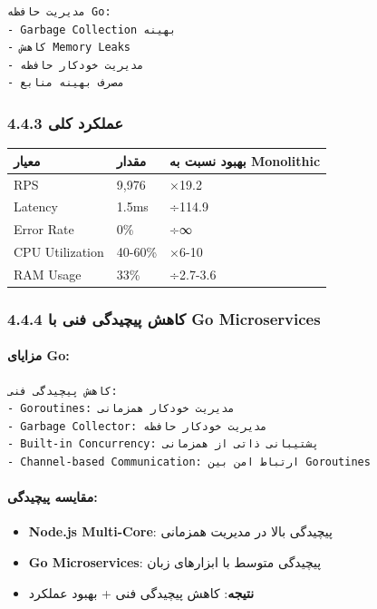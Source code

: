 \documentclass[
]{article}
\newcounter{none} %
\providecommand{\tightlist}{%
  \setlength{\itemsep}{0pt}\setlength{\parskip}{0pt}}
\begin{document}
\begin{verbatim}
مدیریت حافظه Go:
- Garbage Collection بهینه
- کاهش Memory Leaks
- مدیریت خودکار حافظه
- مصرف بهینه منابع
\end{verbatim}

\subsubsection{4.4.3 عملکرد
کلی}\label{ux639ux645ux644ux6a9ux631ux62f-ux6a9ux644ux6cc-2}

{\def\LTcaptype{none} %
\begin{longtable}[]{@{}lll@{}}
\toprule\noalign{}
معیار & مقدار & بهبود نسبت به Monolithic \\
\midrule\noalign{}
\endhead
\bottomrule\noalign{}
\endlastfoot
RPS & 9,976 & ×19.2 \\
Latency & 1.5ms & ÷114.9 \\
Error Rate & 0\% & ÷∞ \\
CPU Utilization & 40-60\% & ×6-10 \\
RAM Usage & 33\% & ÷2.7-3.6 \\
\end{longtable}
}

\subsubsection{4.4.4 کاهش پیچیدگی فنی با Go
Microservices}\label{ux6a9ux627ux647ux634-ux67eux6ccux686ux6ccux62fux6afux6cc-ux641ux646ux6cc-ux628ux627-go-microservices}

\paragraph{مزایای Go:}\label{ux645ux632ux627ux6ccux627ux6cc-go}

\begin{verbatim}
کاهش پیچیدگی فنی:
- Goroutines: مدیریت خودکار همزمانی
- Garbage Collector: مدیریت خودکار حافظه
- Built-in Concurrency: پشتیبانی ذاتی از همزمانی
- Channel-based Communication: ارتباط امن بین Goroutines
\end{verbatim}

\paragraph{مقایسه
پیچیدگی:}\label{ux645ux642ux627ux6ccux633ux647-ux67eux6ccux686ux6ccux62fux6afux6cc}

\begin{itemize}
\tightlist
\item
  \textbf{Node.js Multi-Core}: پیچیدگی بالا در مدیریت همزمانی
\item
  \textbf{Go Microservices}: پیچیدگی متوسط با ابزارهای زبان
\item
  \textbf{نتیجه}: کاهش پیچیدگی فنی + بهبود عملکرد
\end{itemize}
\end{document}
